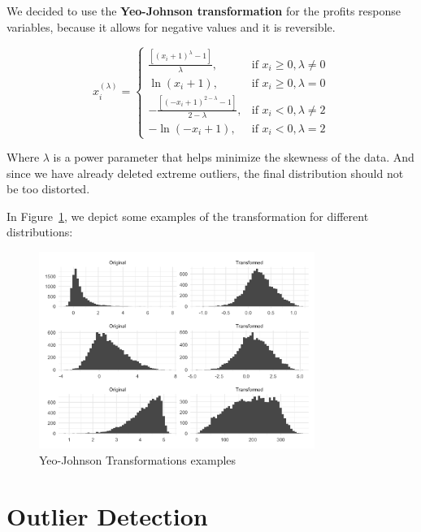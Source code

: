 \documentclass[11pt,english,a4paper,hidelinks]{book}
\begin{document}
\vspace{0.5cm}
\noindent We decided to use the \textbf{Yeo-Johnson transformation} for the profits response variables, because it allows for negative values and it is reversible.

\begin{equation}
x_i^{(\lambda)} =
\begin{cases}
\frac{[{(x_i + 1)}^\lambda - 1]}{\lambda}, & \text{if } x_i \geq 0, \lambda \neq 0 \\
\ln(x_i + 1), & \text{if } x_i \geq 0, \lambda = 0 \\
-\frac{[{(-x_i + 1)}^{2 - \lambda} - 1]}{2 - \lambda}, & \text{if } x_i < 0, \lambda \neq 2 \\
-\ln(-x_i + 1), & \text{if } x_i < 0, \lambda = 2
\end{cases}
\end{equation}

\noindent Where \(\lambda\) is a power parameter that helps minimize the skewness of the data. And since we have already deleted extreme outliers, the final distribution should not be too distorted.

\vspace{0.5cm}

\noindent In Figure~\ref{fig:yeo-johnson}, we depict some examples of the transformation for different distributions:

\begin{figure}[H]
    \centering
    \includegraphics[width=0.8\textwidth]{images/code/transformations/yeo-johnson.png}
    \caption{Yeo-Johnson Transformations examples}
    \label{fig:yeo-johnson}
\end{figure}


\section{Outlier Detection}
\end{document}
